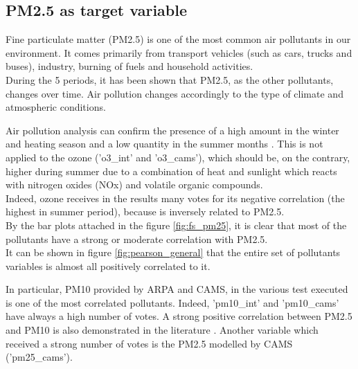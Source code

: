 \subsection{PM2.5 as target variable}
Fine particulate matter (PM2.5) is one of the most common air pollutants in our environment. 
It comes primarily from transport vehicles (such as cars, trucks and buses), industry, burning of fuels and household activities. \\
During the 5 periods, it has been shown that PM2.5, as the other pollutants, changes over time. Air pollution changes accordingly to the type of climate and atmospheric conditions.\\

Air pollution analysis can confirm the presence of a high amount in the winter and heating season and a low quantity in the summer months \cite{cichowicz2017dispersion}. This is not applied to the ozone ('o3\_int' and 'o3\_cams'), which should be, on the contrary, higher during summer due to a combination of heat and sunlight which reacts with nitrogen oxides (NOx) and volatile organic compounds.\\
Indeed, ozone receives in the results many votes for its negative correlation (the highest in summer period), because is inversely related to PM2.5.\\
By the bar plots attached in the figure \ref{fig:fs_pm25}, it is clear that most of the pollutants have a strong or moderate correlation with PM2.5. \\
It can be shown in figure \ref{fig:pearson_general} that the entire set of pollutants variables is almost all positively correlated to it.\par
In particular, PM10 provided by ARPA and CAMS, in the various test executed is one of the most correlated pollutants. Indeed, 'pm10\_int' and 'pm10\_cams' have always a high number of votes. 
A strong positive correlation between PM2.5 and PM10 is also demonstrated in the literature \cite{zhou2016concentrations}.
Another variable which received a strong number of votes is the PM2.5 modelled by CAMS ('pm25\_cams'). \\
